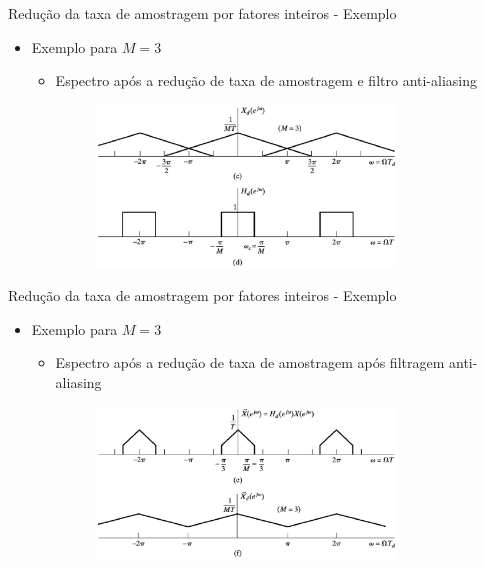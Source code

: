 \begin{slide}{Redução da taxa de amostragem por fatores inteiros - Exemplo}
	\begin{itemize}
		\item Exemplo para $M=3$
			\begin{itemize}
		\item Espectro após a redução de taxa de amostragem e filtro anti-aliasing
			\begin{figure}
				\centering
				\includegraphics[width=0.8\textwidth]{figs/4-21cd.eps}
		        \end{figure}
			\end{itemize}
	\end{itemize}
\end{slide}
\begin{slide}{Redução da taxa de amostragem por fatores inteiros - Exemplo}
	\begin{itemize}
		\item Exemplo para $M=3$
			\begin{itemize}
		\item Espectro após a redução de taxa de amostragem após filtragem anti-aliasing
			\begin{figure}
				\centering
				\includegraphics[width=0.8\textwidth]{figs/4-21ef.eps}
		        \end{figure}
			\end{itemize}
	\end{itemize}
\end{slide}
